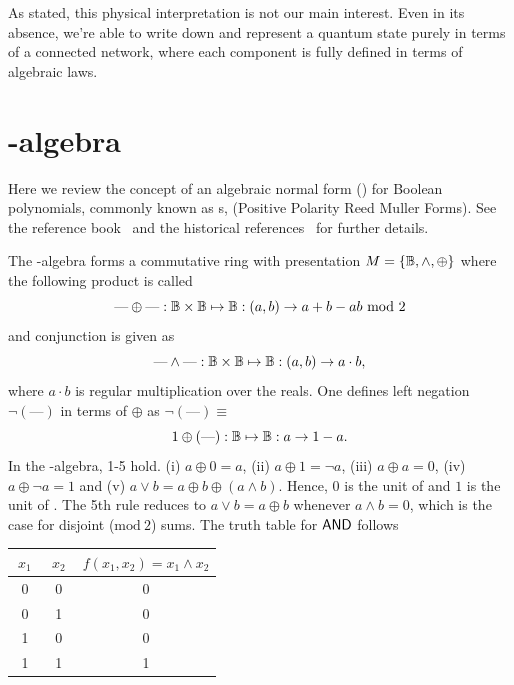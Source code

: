 As stated, this physical
interpretation is not our main interest. Even in its absence, we're able to write
down and represent a quantum
state purely in terms of a connected network, where each component is fully defined
in terms of algebraic laws.





\section{\XOR-algebra}\label{sec:Boolean}
Here we review the concept of an algebraic normal form (\ANF) for Boolean
polynomials, commonly known as \PPRM s, (Positive Polarity Reed Muller Forms).  See the reference
book~\cite{Davio78} and the historical references~\cite{Cohn62,
xor70} for further details. 

\begin{definition}
The \XOR{}-algebra forms a commutative ring with presentation
$M=\{{\mathbb B},\wedge,\oplus\}$ where the following product is called \XOR
\begin{equation}
\text{---}\oplus\text{---}:{\mathbb B}\times {\mathbb B}\mapsto {\mathbb B}: (a,b)\rightarrow
a+b-ab~\text{mod}~2
\end{equation}
and conjunction is given as
\begin{equation}
\text{---}\wedge\text{---}:{\mathbb B}\times {\mathbb B}\mapsto {\mathbb B}: (a,b)\rightarrow a\cdot b, 
\end{equation}
where $a\cdot b$ is regular multiplication over the reals.  One defines left negation
$\neg(\text{---})$ in terms of $\oplus$ as
$\neg(\text{---})\equiv$
\begin{equation}
  \text{1}\oplus(\text{---}):{\mathbb B} \mapsto {\mathbb B}: a\rightarrow 1-a.
\end{equation}
In the \XOR-algebra, 1-5 hold.  (i) $a\oplus 0 = a$, (ii) $a\oplus 1 = \neg a$, (iii)
$a\oplus a = 0$, (iv) $a\oplus \neg a = 1$ and (v) $a\vee b = a\oplus b\oplus
(a\wedge b)$.  Hence, $0$ is the unit of \XOR{} and $1$ is the unit of \AND. The 5th
rule
reduces to $a\vee b = a\oplus b$ whenever $a\wedge b=0$, which is the case for
disjoint ($\text{mod}~2$) sums.  The 
truth table for $\text{\sf AND}$ follows
\begin{center}
\begin{tabular}{c|c|c}
$~x_1~$ & $~x_2~$ & $f(x_1,x_2)=x_1\wedge x_2$ \\ \hline
0 & 0 & 0 \\
0 & 1 & 0 \\
1 & 0 & 0 \\
1 & 1 & 1
\end{tabular}
\end{center}
\end{definition}

